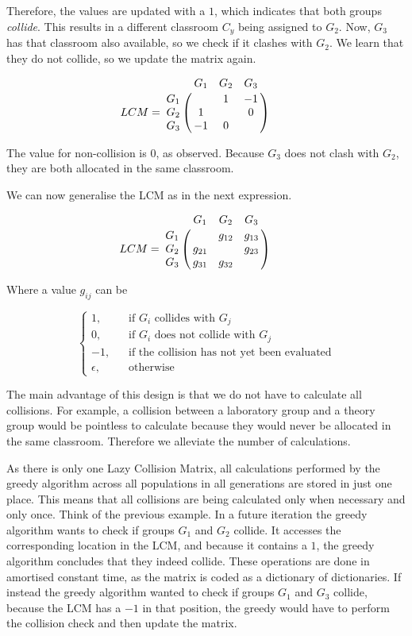 Therefore, the values are updated with a $1$, which indicates that both groups \textit{collide}. This results in a different classroom $C_{y}$ being assigned to $G_{2}$. Now, $G_{3}$ has that classroom also available, so we check if it clashes with $G_{2}$. We learn that they do not collide, so we update the matrix again.

\begin{equation}
    LCM = \bordermatrix{
        & G_{1} & G_{2} & G_{3} \cr
        G_{1} &  & 1 & -1 \cr
        G_{2} & 1 &  & 0 \cr
        G_{3} & -1 & 0 & 
    } \qquad
\end{equation}

The value for non-collision is $0$, as observed. Because $G_{3}$ does not clash with $G_{2}$, they are both allocated in the same classroom.

We can now generalise the LCM as in the next expression.

\begin{equation}
    LCM = \bordermatrix{
        & G_{1} & G_{2} & G_{3} \cr
        G_{1} &  & g_{12} & g_{13} \cr
        G_{2} & g_{21} &  & g_{23} \cr
        G_{3} & g_{31} & g_{32} & 
    } \qquad
\end{equation}

Where a value $g_{ij}$ can be

\[
    \begin{cases}
        1\text{,} &\quad\text{if $G_{i}$ collides with $G_{j}$}\\
        0\text{,} &\quad\text{if $G_{i}$ does not collide with $G_{j}$}\\
        -1\text{,} &\quad\text{if the collision has not yet been evaluated}\\
        \epsilon\text{,} &\quad\text{otherwise}
    \end{cases}
\]

The main advantage of this design is that we do not have to calculate all collisions. For example, a collision between a laboratory group and a theory group would be pointless to calculate because they would never be allocated in the same classroom. Therefore we alleviate the number of calculations. 

As there is only one Lazy Collision Matrix, all calculations performed by the greedy algorithm across all populations in all generations are stored in just one place. This means that all collisions are being calculated only when necessary and only once. Think of the previous example. In a future iteration the greedy algorithm wants to check if groups $G_{1}$ and $G_{2}$ collide. It accesses the corresponding location in the LCM, and because it contains a $1$, the greedy algorithm concludes that they indeed collide. These operations are done in amortised constant time, as the matrix is coded as a dictionary of dictionaries. If instead the greedy algorithm wanted to check if groups $G_{1}$ and $G_{3}$ collide, because the LCM has a $-1$ in that position, the greedy would have to perform the collision check and then update the matrix.



